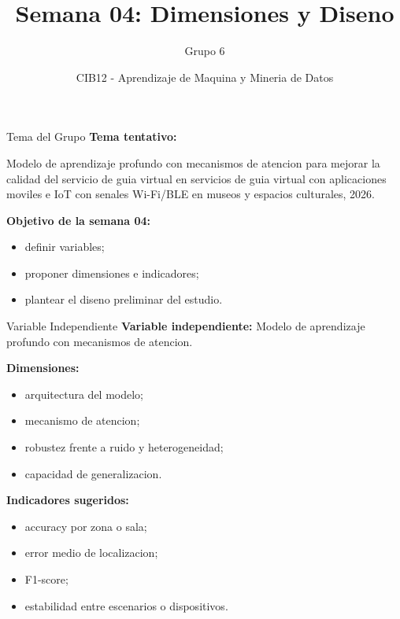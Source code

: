 \documentclass[aspectratio=169,11pt]{beamer}
\title{Semana 04: Dimensiones y Diseno}
\author{Grupo 6}
\date{CIB12 - Aprendizaje de Maquina y Mineria de Datos}
\begin{document}
\begin{frame}
  \titlepage
\end{frame}

\begin{frame}{Tema del Grupo}
\justifying
\textbf{Tema tentativo:}

\vspace{0.5em}

Modelo de aprendizaje profundo con mecanismos de atencion para mejorar la calidad del servicio de guia virtual en servicios de guia virtual con aplicaciones moviles e IoT con senales Wi-Fi/BLE en museos y espacios culturales, 2026.

\vspace{0.7em}

\textbf{Objetivo de la semana 04:}
\begin{itemize}
  \item definir variables;
  \item proponer dimensiones e indicadores;
  \item plantear el diseno preliminar del estudio.
\end{itemize}
\end{frame}

\begin{frame}{Variable Independiente}
\justifying
\textbf{Variable independiente:} Modelo de aprendizaje profundo con mecanismos de atencion.

\vspace{0.6em}

\textbf{Dimensiones:}
\begin{itemize}
  \item arquitectura del modelo;
  \item mecanismo de atencion;
  \item robustez frente a ruido y heterogeneidad;
  \item capacidad de generalizacion.
\end{itemize}

\textbf{Indicadores sugeridos:}
\begin{itemize}
  \item accuracy por zona o sala;
  \item error medio de localizacion;
  \item F1-score;
  \item estabilidad entre escenarios o dispositivos.
\end{itemize}
\end{frame}
\end{document}
